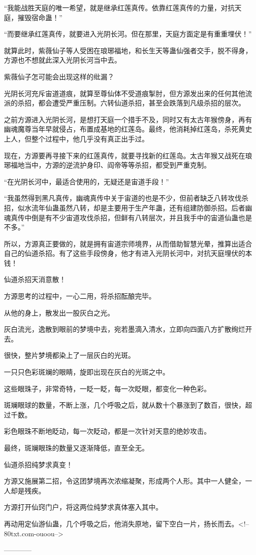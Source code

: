 \begin{this_body}
“我能战胜天庭的唯一希望，就是继承红莲真传。依靠红莲真传的力量，对抗天庭，摧毁宿命蛊！”

“而要继承红莲真传，就要进入光阴长河。但在那里，天庭方面定是有重重埋伏！”

就算此时，紫薇仙子等人受困在琅琊福地，和长生天等蛊仙强者交手，脱不得身，方源也不想就此深入光阴长河当中去。

紫薇仙子怎可能会出现这样的纰漏？

光阴长河充斥宙道道痕，就算至尊仙体不受道痕掣肘，但方源发出来的任何其他流派的杀招，都会遭受严重压制。六转仙道杀招，甚至会跌落到凡级杀招的层次。

之前方源进入光阴长河，是想打天庭一个措手不及，同时又有太古年猴傍身，再有幽魂魔尊当年早就侵占，布置成基地的红莲岛。最终，他消耗掉红莲岛，杀死黄史上人，但整个过程中，他几乎没有真正出手过。

现在，方源要再寻接下来的红莲真传，就要寻找新的红莲岛。太古年猴又战死在琅琊福地当中，方源的逆流护身印、阎帝等等杀招，都受到严重克制。

“在光阴长河中，最适合使用的，无疑还是宙道手段！”

“我虽然得到黑凡真传，幽魂真传中关于宙道的也是不少，但前者缺乏八转攻伐杀招，似水流年仙蛊虽然八转，却是主要用于生产年蛊，还有组建防御杀招。后者幽魂真传中倒是有不少宙道攻伐杀招，但鲜有八转层次，并且我手中的宙道仙蛊也是不多。”

所以，方源真正要做的，就是拥有宙道宗师境界，从而借助智慧光晕，推算出适合自己的仙道杀招。有了这些手段傍身，他才有进入光阴长河中，对抗天庭埋伏的本钱！

仙道杀招天消意散！

方源思考的过程中，一心二用，将杀招酝酿完毕。

从他的身上，散发出一股灰白之光。

灰白流光，逸散到眼前的梦境中去，宛若墨滴入清水，立即向四面八方扩散绚烂开去。

很快，整片梦境都染上了一层灰白的光斑。

一只只色彩斑斓的眼睛，旋即出现在灰白的光斑之中。

这些眼珠子，非常奇特，一眨一眨，每一次眨眼，都变化一种色彩。

斑斓眼球的数量，不断上涨，几个呼吸之后，就从数十个暴涨到了数百，很快，超过千数。

彩色眼珠不断地眨动，每一次眨动，都是一次针对天意的绝妙攻击。

最终，斑斓眼珠的数量又逐渐降低，直至全无。

仙道杀招纯梦求真变！

方源又施展第二招，令这团梦境再次浓缩凝聚，形成两个人形。其中一人健全，一人却是残疾。

方源打开仙窍门户，将这两位纯梦求真体塞入其中。

再动用定仙游仙蛊，几个呼吸之后，他消失原地，留下空白一片，扬长而去。<!--80txt.com-ouoou-->

------------

\end{this_body}

